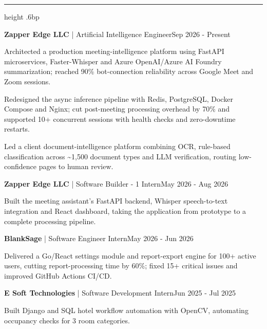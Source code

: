 \documentclass[10pt]{article}
\newcommand{\resumesection}[1]{\par\vspace{5.5bp}{\fontsize{10.56bp}{12.5bp}\selectfont\bfseries #1\par}\vspace{1bp}\hrule height .6bp\vspace{3bp}}
\newcommand{\entry}[2]{\par #1\hfill #2\par}
\newcommand{\nextentry}[2]{\par\vspace{2bp}\entry{#1}{#2}}
\newcommand{\bulletitem}[1]{\par\begingroup\hangindent=11.52bp\hangafter=1\noindent\makebox[11.52bp][l]{\textbullet}#1\par\endgroup}
\begin{document}
\resumesection{EXPERIENCE}
\entry{\textbf{Zapper Edge LLC} | Artificial Intelligence Engineer}{Sep 2026 - Present}
\bulletitem{Architected a production meeting-intelligence platform using FastAPI microservices, Faster-Whisper and Azure OpenAI/Azure AI Foundry summarization; reached 90\% bot-connection reliability across Google Meet and Zoom sessions.}
\bulletitem{Redesigned the async inference pipeline with Redis, PostgreSQL, Docker Compose and Nginx; cut post-meeting processing overhead by 70\% and supported 10+ concurrent sessions with health checks and zero-downtime restarts.}
\bulletitem{Led a client document-intelligence platform combining OCR, rule-based classification across \textasciitilde1,500 document types and LLM verification, routing low-confidence pages to human review.}
\nextentry{\textbf{Zapper Edge LLC} | Software Builder - 1 Intern}{May 2026 - Aug 2026}
\bulletitem{Built the meeting assistant's FastAPI backend, Whisper speech-to-text integration and React dashboard, taking the application from prototype to a complete processing pipeline.}
\nextentry{\textbf{BlankSage} | Software Engineer Intern}{May 2026 - Jun 2026}
\bulletitem{Delivered a Go/React settings module and report-export engine for 100+ active users, cutting report-processing time by 60\%; fixed 15+ critical issues and improved GitHub Actions CI/CD.}
\nextentry{\textbf{E Soft Technologies} | Software Development Intern}{Jun 2025 - Jul 2025}
\bulletitem{Built Django and SQL hotel workflow automation with OpenCV, automating occupancy checks for 3 room categories.}
\end{document}
